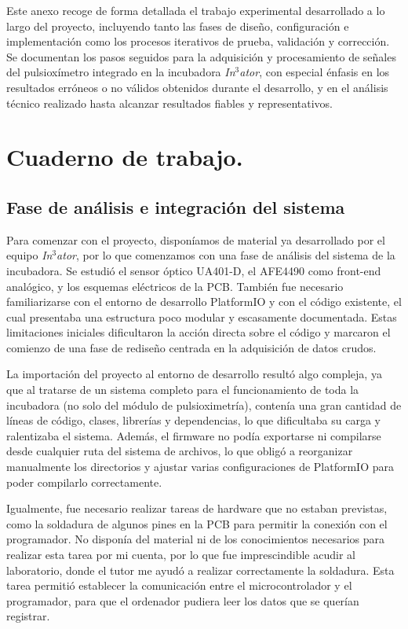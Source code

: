
Este anexo recoge de forma detallada el trabajo experimental desarrollado a lo largo del proyecto, incluyendo tanto las fases de diseño, configuración e implementación como los procesos iterativos de prueba, validación y corrección. Se documentan los pasos seguidos para la adquisición y procesamiento de señales del pulsioxímetro integrado en la incubadora \textit{In$^3$ator}, con especial énfasis en los resultados erróneos o no válidos obtenidos durante el desarrollo, y en el análisis técnico realizado hasta alcanzar resultados fiables y representativos.

\section{Cuaderno de trabajo.}

\subsection{Fase de análisis e integración del sistema }

Para comenzar con el proyecto, disponíamos de material ya desarrollado por el equipo \textit{In$^3$ator}, por lo que comenzamos con una fase de análisis del sistema de la incubadora. Se estudió el sensor óptico UA401-D, el AFE4490 como front-end analógico, y los esquemas eléctricos de la PCB. También fue necesario familiarizarse con el entorno de desarrollo PlatformIO y con el código existente, el cual presentaba una estructura poco modular y escasamente documentada. Estas limitaciones iniciales dificultaron la acción directa sobre el código y marcaron el comienzo de una fase de rediseño centrada en la adquisición de datos crudos. 

La importación del proyecto al entorno de desarrollo resultó algo compleja, ya que al tratarse de un sistema completo para el funcionamiento de toda la incubadora (no solo del módulo de pulsioximetría), contenía una gran cantidad de líneas de código, clases, librerías y dependencias, lo que dificultaba su carga y ralentizaba el sistema. 
Además, el firmware no podía exportarse ni compilarse desde cualquier ruta del sistema de archivos, lo que obligó a reorganizar manualmente los directorios y ajustar varias configuraciones de PlatformIO para poder compilarlo correctamente. 

Igualmente, fue necesario realizar tareas de hardware que no estaban previstas, como la soldadura de algunos pines en la PCB para permitir la conexión con el programador. No disponía del material ni de los conocimientos necesarios para realizar esta tarea por mi cuenta, por lo que fue imprescindible acudir al laboratorio, donde el tutor me ayudó a realizar correctamente la soldadura.  Esta tarea permitió establecer la comunicación entre el microcontrolador y el programador, para que el ordenador pudiera leer los datos que se querían registrar.

